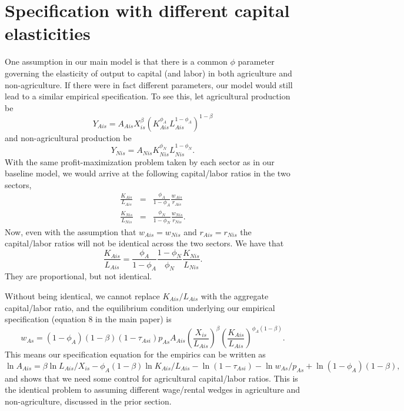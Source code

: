 \documentclass[11pt]{article}
\begin{document}
\section{Specification with different capital elasticities}
One assumption in our main model is that there is a common $\phi$ parameter governing the elasticity of output to capital (and labor) 
in both agriculture and non-agriculture. If there were in fact different parameters, our model would still lead to a similar empirical specification. To see this, let agricultural production be
\begin{equation}
    Y_{Ais} = A_{Ais} X_{is}^{\beta} \left(K_{Ais}^{\phi_A}L_{Ais}^{1-\phi_A}\right)^{1-\beta}
\end{equation}
and non-agricultural production be
\begin{equation}
    Y_{Nis} = A_{Nis} K_{Nis}^{\phi_N}L_{Nis}^{1-\phi_N}.
\end{equation}
With the same profit-maximization problem taken by each sector as in our baseline model, we would arrive at the following capital/labor ratios in the two sectors,
\begin{eqnarray}
    \frac{K_{Ais}}{L_{Ais}} &=& \frac{\phi_A}{1-\phi_A} \frac{w_{Ais}}{r_{Ais}} \\
    \frac{K_{Nis}}{L_{Nis}} &=& \frac{\phi_N}{1-\phi_N} \frac{w_{Nis}}{r_{Nis}}.
\end{eqnarray}
Now, even with the assumption that $w_{Ais} = w_{Nis}$ and $r_{Ais}=r_{Nis}$ the capital/labor ratios will not be identical across the two sectors. We have that
\begin{equation}
    \frac{K_{Ais}}{L_{Ais}} = \frac{\phi_A}{1-\phi_A}\frac{1-\phi_N}{\phi_N}\frac{K_{Nis}}{L_{Nis}}. \label{eq_klan}
\end{equation}
They are proportional, but not identical. 

Without being identical, we cannot replace $K_{Ais}/L_{Ais}$ with the aggregate capital/labor ratio, and the equilibrium condition underlying our empirical specification (equation 8 in the main paper) is
\begin{equation}
    w_{As} = (1-\phi_A)(1-\beta) (1-\tau_{Asi}) p_{As} A_{Ais} \left(\frac{X_{is}}{L_{Ais}}\right)^{\beta} \left(\frac{K_{Ais}}{L_{Ais}}\right)^{\phi_A(1-\beta)}. 
\end{equation}
This means our specification equation for the empirics can be written as
\begin{equation}
    \ln A_{Ais} = \beta \ln L_{Ais}/X_{is} - \phi_A(1-\beta) \ln K_{Ais}/L_{Ais} - \ln (1-\tau_{Asi}) - \ln w_{As}/p_{As} + \ln (1-\phi_A)(1-\beta),
\end{equation}
and shows that we need some control for agricultural capital/labor ratios. This is the identical problem to assuming different wage/rental wedges in agriculture and non-agriculture, discussed in the prior section.
\end{document}
